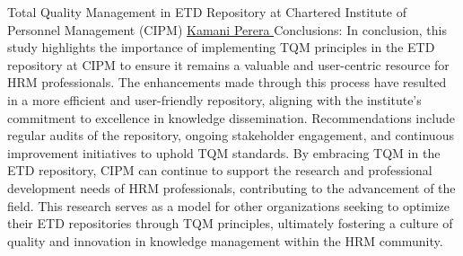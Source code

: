 \begin{abstract_online}{Total Quality Management in ETD Repository at Chartered Institute of Personnel Management (CIPM) }{%
        \underline{Kamani Perera }}
      Conclusions: In conclusion, this study highlights the importance of implementing TQM principles in the ETD repository at CIPM to ensure it remains a valuable and user-centric resource for HRM professionals. The enhancements made through this process have resulted in a more efficient and user-friendly repository, aligning with the institute's commitment to excellence in knowledge dissemination. Recommendations include regular audits of the repository, ongoing stakeholder engagement, and continuous improvement initiatives to uphold TQM standards. By embracing TQM in the ETD repository, CIPM can continue to support the research and professional development needs of HRM professionals, contributing to the advancement of the field. This research serves as a model for other organizations seeking to optimize their ETD repositories through TQM principles, ultimately fostering a culture of quality and innovation in knowledge management within the HRM community.
    \end{abstract_online}
    
